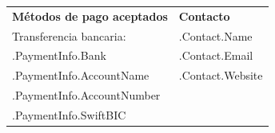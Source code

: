 \documentclass{article}
\begin{document}
\begin{tabular}{@{}p{}p{}@{}}
    \textbf{Métodos de pago aceptados} & \textbf{Contacto} \\
    Transferencia bancaria: &  {{ .Contact.Name }}\\
    {{ .PaymentInfo.Bank }} &   {{ .Contact.Email }} \\
    {{ .PaymentInfo.AccountName }} & {{ .Contact.Website }} \\
    {{ .PaymentInfo.AccountNumber }} & \\
    {{ .PaymentInfo.SwiftBIC }} & \\
\end{tabular}

\vspace{1cm}
\end{document}
